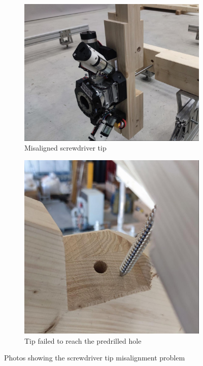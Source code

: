\begin{figure}[!hb]
    \centering
    \begin{subfigure}[b]{0.49\textwidth}
        \centering
        \includegraphics[width=\textwidth]{images/7b/img80.jpg}
        \caption{Misaligned screwdriver tip}
    \end{subfigure}
    \hfill
    \begin{subfigure}[b]{0.49\textwidth}
        \centering
        \includegraphics[width=\textwidth]{images/7b/img81.jpg}
        \caption{Tip failed to reach the predrilled hole}
    \end{subfigure}
    \caption{Photos showing the screwdriver tip misalignment problem}
    \label{fig:screwdriver-tip-misalignment}
\end{figure}

